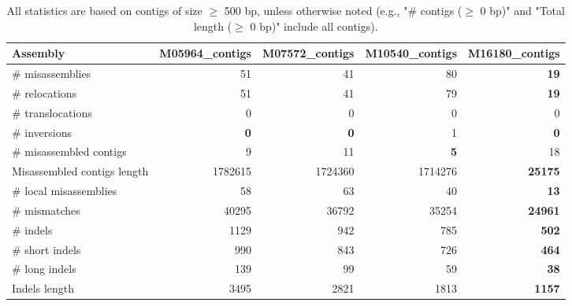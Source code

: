 \documentclass[12pt,a4paper]{article}
\begin{document}
\begin{table}[ht]
\begin{center}
\caption{All statistics are based on contigs of size $\geq$ 500 bp, unless otherwise noted (e.g., "\# contigs ($\geq$ 0 bp)" and "Total length ($\geq$ 0 bp)" include all contigs).}
\begin{tabular}{|l*{4}{|r}|}
\hline
Assembly & M05964\_contigs & M07572\_contigs & M10540\_contigs & M16180\_contigs \\ \hline
\# misassemblies & 51 & 41 & 80 & {\bf 19} \\ \hline
\hspace{5mm}\# relocations & 51 & 41 & 79 & {\bf 19} \\ \hline
\hspace{5mm}\# translocations & 0 & 0 & 0 & 0 \\ \hline
\hspace{5mm}\# inversions & {\bf 0} & {\bf 0} & 1 & {\bf 0} \\ \hline
\# misassembled contigs & 9 & 11 & {\bf 5} & 18 \\ \hline
Misassembled contigs length & 1782615 & 1724360 & 1714276 & {\bf 25175} \\ \hline
\# local misassemblies & 58 & 63 & 40 & {\bf 13} \\ \hline
\# mismatches & 40295 & 36792 & 35254 & {\bf 24961} \\ \hline
\# indels & 1129 & 942 & 785 & {\bf 502} \\ \hline
\hspace{5mm}\# short indels & 990 & 843 & 726 & {\bf 464} \\ \hline
\hspace{5mm}\# long indels & 139 & 99 & 59 & {\bf 38} \\ \hline
Indels length & 3495 & 2821 & 1813 & {\bf 1157} \\ \hline
\end{tabular}
\end{center}
\end{table}
\end{document}
